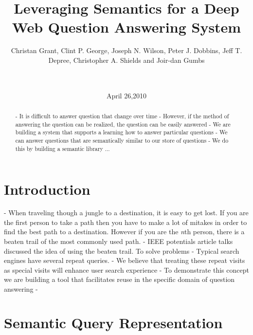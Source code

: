 \documentclass{www2010-submission}
\begin{document}
\title{Leveraging Semantics for a Deep Web Question Answering System} 
\author{
	 \alignauthor Christan Grant, Clint P. George, Joseph N. Wilson, Peter J. Dobbins, Jeff T. Depree, Christopher A. Shields and Joir-dan Gumbs\\
	  \\  \\
}
\date{April 26,2010}

\maketitle

\begin{abstract}
- It is difficult to answer question that change over time
- However, if the method of answering the question can be realized, the question can be easily answered
- We are building a system that supports a learning how to answer particular questions
- We can answer questions that are semantically similar to our store of questions
- We do this by building a semantic library ...
\end{abstract}




\section{Introduction}
- When traveling though a jungle to a destination, it is easy to get lost.  If you are the first person to take a path then you have to make a lot of mitakes in order to find the best path to a destination.  However if you are the \emph{n}th person, there is a beaten trail of the most commonly used path.
- IEEE potentials article talks discussed the idea of using the beaten trail. \cite{5379671} To solve problems
- Typical search engines have several repeat queries.
- We believe that treating these repeat visits as special visits will enhance user search experience
- To demonstrate this concept we are building a tool that facilitates reuse in the specific domain of question answering
-
\section{Semantic Query Representation}
\end{document}
